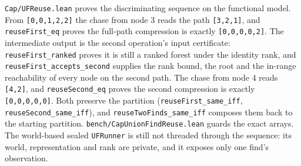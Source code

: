 \documentclass[10pt,a4paper]{article}
\newcommand{\file}[1]{\texttt{\small #1}}
\begin{document}
\file{Cap/UFReuse.lean} proves the discriminating sequence on the functional
model. From \texttt{[0,0,1,2,2]} the chase from node 3 reads the path
\texttt{[3,2,1]}, and \texttt{reuseFirst\_eq} proves the full-path compression is
exactly \texttt{[0,0,0,0,2]}. The intermediate output is the second operation's
input certificate: \texttt{reuseFirst\_ranked} proves it is still a ranked forest
under the identity rank, and \texttt{reuseFirst\_accepts\_second} supplies the
rank bound, the root and the in-range reachability of every node on the second
path. The chase from node 4 reads \texttt{[4,2]}, and \texttt{reuseSecond\_eq}
proves the second compression is exactly \texttt{[0,0,0,0,0]}. Both preserve the
partition (\texttt{reuseFirst\_same\_iff}, \texttt{reuseSecond\_same\_iff}), and
\texttt{reuseTwoFinds\_same\_iff} composes them back to the starting partition.
\texttt{bench/CapUnionFindReuse.lean} guards the exact arrays. The world-based
sealed \texttt{UFRunner} is still not threaded through the sequence: its world,
representation and rank are private, and it exposes only one find's observation.
\end{document}
